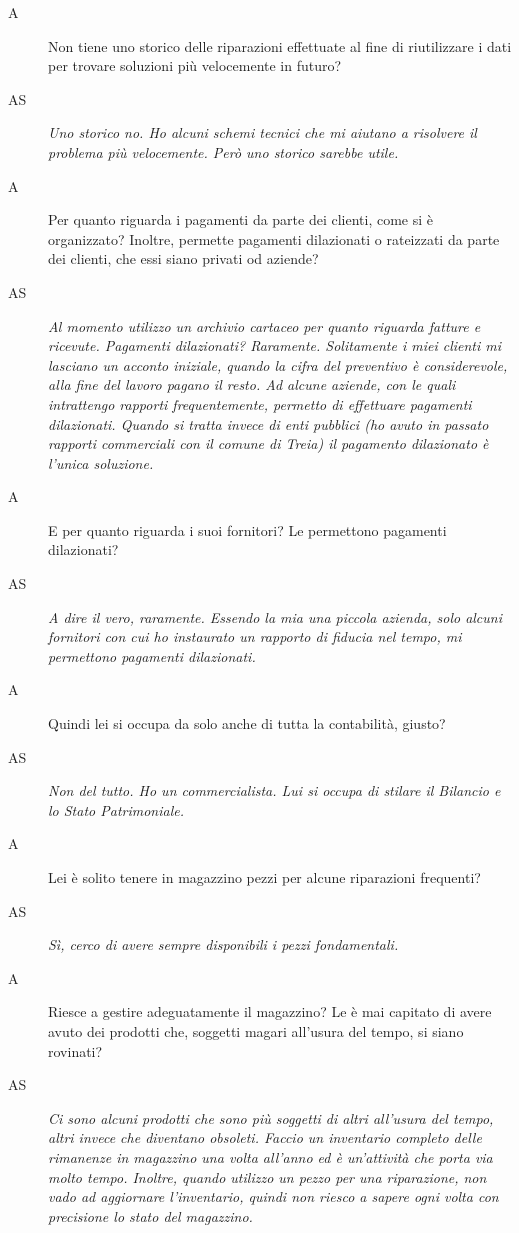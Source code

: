 \begin{description}
 			\item[A]
 				Non tiene uno storico delle riparazioni effettuate al fine di riutilizzare i dati per trovare soluzioni più velocemente in futuro?
 			\item[AS]
 				\emph{Uno storico no. Ho alcuni schemi tecnici che mi aiutano a risolvere il problema più velocemente. Però uno storico sarebbe utile.}
 			\item[A]
 				Per quanto riguarda i pagamenti da parte dei clienti, come si è organizzato? Inoltre, permette pagamenti dilazionati o rateizzati da parte dei clienti, che essi siano privati od aziende?
 			\item[AS]
 				\emph{Al momento utilizzo un archivio cartaceo per quanto riguarda fatture e ricevute. Pagamenti dilazionati? Raramente. Solitamente i miei clienti mi lasciano un acconto iniziale, quando la cifra del preventivo è considerevole, alla fine del lavoro pagano il resto. Ad alcune aziende, con le quali intrattengo rapporti frequentemente, permetto di effettuare pagamenti dilazionati. Quando si tratta invece di enti pubblici (ho avuto in passato rapporti commerciali con il comune di Treia) il pagamento dilazionato è l'unica soluzione.}
 			\item[A]
 				E per quanto riguarda i suoi fornitori? Le permettono pagamenti dilazionati?
 			\item[AS]
 				\emph{A dire il vero, raramente. Essendo la mia una piccola azienda, solo alcuni fornitori con cui ho instaurato un rapporto di fiducia nel tempo, mi permettono pagamenti dilazionati.}
 			\item[A]
 				Quindi lei si occupa da solo anche di tutta la contabilità, giusto?
 			\item[AS]
 				\emph{Non del tutto. Ho un commercialista. Lui si occupa di stilare il Bilancio e lo Stato Patrimoniale.}
 			\item[A]
 				Lei è solito tenere in magazzino pezzi per alcune riparazioni frequenti?
 			\item[AS]
 				\emph{Sì, cerco di avere sempre disponibili i pezzi fondamentali.}
 			\item[A]
 				Riesce a gestire adeguatamente il magazzino? Le è mai capitato di avere avuto dei prodotti che, soggetti magari all'usura del tempo, si siano rovinati?
 			\item[AS]
 				\emph{Ci sono alcuni prodotti che sono più soggetti di altri all'usura del tempo, altri invece che diventano obsoleti. Faccio un inventario completo delle rimanenze in magazzino una volta all'anno ed è un'attività che porta via molto tempo. Inoltre, quando utilizzo un pezzo per una riparazione, non vado ad aggiornare l'inventario, quindi non riesco a sapere ogni volta con precisione lo stato del magazzino.}

\end{description}
